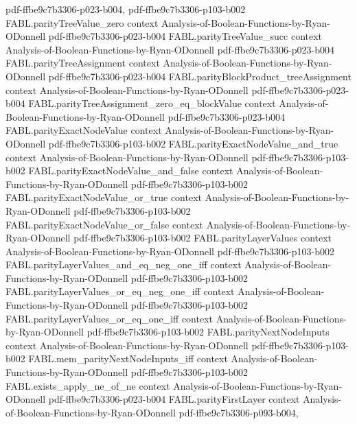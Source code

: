 \begin{theorem}
  {pdf-ffbe9c7b3306-p023-b004,
    pdf-ffbe9c7b3306-p103-b002}
\proofstep
  {FABL.parityTreeValue_zero}
  {context}
  {Analysis-of-Boolean-Functions-by-Ryan-ODonnell}
  {pdf-ffbe9c7b3306-p023-b004}
\proofstep
  {FABL.parityTreeValue_succ}
  {context}
  {Analysis-of-Boolean-Functions-by-Ryan-ODonnell}
  {pdf-ffbe9c7b3306-p023-b004}
\proofstep
  {FABL.parityTreeAssignment}
  {context}
  {Analysis-of-Boolean-Functions-by-Ryan-ODonnell}
  {pdf-ffbe9c7b3306-p023-b004}
\proofstep
  {FABL.parityBlockProduct_treeAssignment}
  {context}
  {Analysis-of-Boolean-Functions-by-Ryan-ODonnell}
  {pdf-ffbe9c7b3306-p023-b004}
\proofstep
  {FABL.parityTreeAssignment_zero_eq_blockValue}
  {context}
  {Analysis-of-Boolean-Functions-by-Ryan-ODonnell}
  {pdf-ffbe9c7b3306-p023-b004}
\proofstep
  {FABL.parityExactNodeValue}
  {context}
  {Analysis-of-Boolean-Functions-by-Ryan-ODonnell}
  {pdf-ffbe9c7b3306-p103-b002}
\proofstep
  {FABL.parityExactNodeValue_and_true}
  {context}
  {Analysis-of-Boolean-Functions-by-Ryan-ODonnell}
  {pdf-ffbe9c7b3306-p103-b002}
\proofstep
  {FABL.parityExactNodeValue_and_false}
  {context}
  {Analysis-of-Boolean-Functions-by-Ryan-ODonnell}
  {pdf-ffbe9c7b3306-p103-b002}
\proofstep
  {FABL.parityExactNodeValue_or_true}
  {context}
  {Analysis-of-Boolean-Functions-by-Ryan-ODonnell}
  {pdf-ffbe9c7b3306-p103-b002}
\proofstep
  {FABL.parityExactNodeValue_or_false}
  {context}
  {Analysis-of-Boolean-Functions-by-Ryan-ODonnell}
  {pdf-ffbe9c7b3306-p103-b002}
\proofstep
  {FABL.parityLayerValues}
  {context}
  {Analysis-of-Boolean-Functions-by-Ryan-ODonnell}
  {pdf-ffbe9c7b3306-p103-b002}
\proofstep
  {FABL.parityLayerValues_and_eq_neg_one_iff}
  {context}
  {Analysis-of-Boolean-Functions-by-Ryan-ODonnell}
  {pdf-ffbe9c7b3306-p103-b002}
\proofstep
  {FABL.parityLayerValues_or_eq_neg_one_iff}
  {context}
  {Analysis-of-Boolean-Functions-by-Ryan-ODonnell}
  {pdf-ffbe9c7b3306-p103-b002}
\proofstep
  {FABL.parityLayerValues_or_eq_one_iff}
  {context}
  {Analysis-of-Boolean-Functions-by-Ryan-ODonnell}
  {pdf-ffbe9c7b3306-p103-b002}
\proofstep
  {FABL.parityNextNodeInputs}
  {context}
  {Analysis-of-Boolean-Functions-by-Ryan-ODonnell}
  {pdf-ffbe9c7b3306-p103-b002}
\proofstep
  {FABL.mem_parityNextNodeInputs_iff}
  {context}
  {Analysis-of-Boolean-Functions-by-Ryan-ODonnell}
  {pdf-ffbe9c7b3306-p103-b002}
\proofstep
  {FABL.exists_apply_ne_of_ne}
  {context}
  {Analysis-of-Boolean-Functions-by-Ryan-ODonnell}
  {pdf-ffbe9c7b3306-p023-b004}
\proofstep
  {FABL.parityFirstLayer}
  {context}
  {Analysis-of-Boolean-Functions-by-Ryan-ODonnell}
  {pdf-ffbe9c7b3306-p093-b004,
}
\end{theorem}
